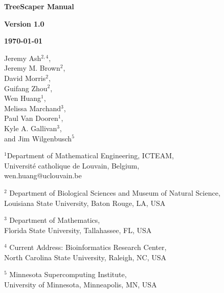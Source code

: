 \documentclass[11pt]{article}
\begin{document}

\begin{titlepage} 

\centering
	{\huge\bfseries TreeScaper Manual \par}
	\vspace{1cm}
	{\LARGE\bfseries Version 1.0\par}
	\vspace{1cm}
	{\Large\bfseries \today\par}
	\vspace{1.5cm}
	{\Large Jeremy Ash$^{2,4}$, \\ Jeremy M. Brown$^{2}$, \\ David Morris$^{2}$, \\ Guifang Zhou$^{2}$, \\ Wen Huang$^{1}$, \\ Melissa Marchand$^{3}$, \\ Paul Van Dooren$^{1}$, \\ Kyle A. Gallivan$^{3}$, \\ and Jim Wilgenbusch$^{5}$\par}
	\vspace{3.5cm}
	{\small $^{1}$Department of Mathematical Engineering, ICTEAM, \\ Universit\'{e} catholique de Louvain, Belgium, \\ wen.huang@uclouvain.be \par}
	\vspace{0.5cm}
	{\small $^{2}$ Department of Biological Sciences and Museum of Natural Science, \\ Louisiana State University, Baton Rouge, LA, USA \par}
	\vspace{0.5cm}
	{\small $^{3}$ Department of Mathematics, \\ Florida State University, Tallahassee, FL, USA \par}
	\vspace{0.5cm}
	{\small $^{4}$ Current Address: Bioinformatics Research Center, \\ North Carolina State University, Raleigh, NC, USA \par}
	\vspace{0.5cm}
	{\small $^{5}$ Minnesota Supercomputing Institute, \\ University of Minnesota, Minneapolis, MN, USA \par}
	\vfill


	

\end{titlepage}
\end{document}
